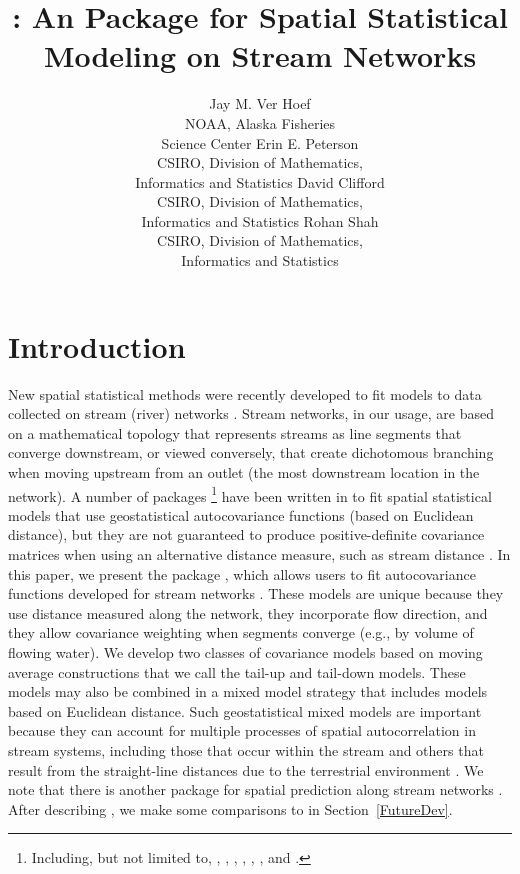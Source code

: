 \documentclass[nojss]{jss}
\author{Jay M. Ver Hoef\\NOAA, Alaska Fisheries \\Science Center \And Erin E. Peterson\\CSIRO, Division of Mathematics, \\ Informatics and Statistics \AND David Clifford\\CSIRO, Division of Mathematics, \\ Informatics and Statistics \And Rohan Shah\\ CSIRO, Division of Mathematics,\\ Informatics and Statistics}
\title{\pkg{SSN}: An \proglang{R} Package for Spatial Statistical Modeling on Stream Networks}
\begin{document}



%
%

\section{Introduction}

New spatial statistical methods were recently developed to fit models
to data collected on stream (river) networks
\citep{Ver:Pete:Move:2010}. Stream networks, in our usage, are based
on a mathematical topology that represents streams as line segments
that converge downstream, or viewed conversely, that create
dichotomous branching when moving upstream from an outlet (the most
downstream location in the network). A number of packages
\footnote{Including, but not limited to, 
\citep{Ribe:Digg:geoR:2001}, 
\citep{Vene:Ripl:mode:2002}, 
\citep{Chri:Ribe:geoR:2002},  \citep{Pebe:mult:2004},
 \citep{Fiel:Deve:Team:2006}, 
\citep{Finl:Bane:Carl:spBa:2007}, and 
\citep{Smit:Yan:Cowl:unif:2008}.}  have been written in 
to fit spatial statistical models that use geostatistical
autocovariance functions (based on Euclidean distance), but they are
not guaranteed to produce positive-definite covariance matrices when
using an alternative distance measure, such as stream distance
\citep{Ver:Pete:Theo:spat:2006}. In this paper, we present the
 package , which allows users to fit
autocovariance functions developed for stream networks
\citep{Ver:Pete:Move:2010}. These models are unique because they use
distance measured along the network, they incorporate flow direction,
and they allow covariance weighting when segments converge (e.g., by
volume of flowing water). We develop two classes of covariance models
based on moving average constructions that we call the tail-up and
tail-down models. These models may also be combined in a mixed model
strategy that includes models based on Euclidean distance. Such
geostatistical mixed models are important because they can account for
multiple processes of spatial autocorrelation in stream systems,
including those that occur within the stream and others that result
from the straight-line distances due to the terrestrial environment
\citep{Ver:Pete:Move:2010}. We note that there is another package  for spatial prediction along stream networks \citep{Skoi:Laah:Koff:Blos:Pebe:Para:Vigl:rtop:2012}.  After describing , we make some comparisons to  in Section~\ref{FutureDev}. 
\end{document}
